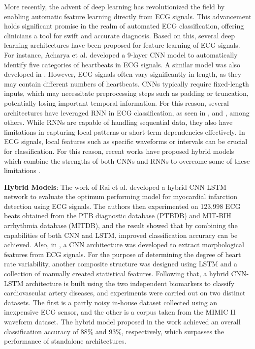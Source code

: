 \documentclass[preprint,12pt]{elsarticle}
\begin{document}
More recently, the advent of deep learning has revolutionized the field by enabling automatic feature learning directly from ECG signals. This advancement holds significant promise in the realm of automated ECG classification, offering clinicians a tool for swift and accurate diagnosis. Based on this, several deep learning architectures have been proposed for feature learning of ECG signals. For instance, Acharya et al. \citep{acharya2017deep} developed a 9-layer CNN model to automatically identify five categories of heartbeats in ECG signals. A similar model was also developed in \citep{baloglu2019classification}. However, ECG signals often vary significantly in length, as they may contain different numbers of heartbeats. CNNs typically require fixed-length inputs, which may necessitate preprocessing steps such as padding or truncation, potentially losing important temporal information. For this reason, several architectures have leveraged RNN in ECG classification, as seen in \citep{singh2018classification}, \citep{prabhakararao2020attentive} and \citep{wang2023single}, among others. While RNNs are capable of handling sequential data, they also have limitations in capturing local patterns or short-term dependencies effectively. In ECG signals, local features such as specific waveforms or intervals can be crucial for classification. For this reason, recent works have proposed hybrid models which combine the strengths of both CNNs and RNNs to overcome some of these limitations \citep{sowmya2022contemplate}.

\textbf{Hybrid Models}: The work of Rai et al. \citep{rai2022hybrid} developed a hybrid CNN-LSTM network to evaluate the optimum performing model for myocardial infarction detection using ECG signals. The authors then experimented on 123,998 ECG beats obtained from the PTB diagnostic database (PTBDB) and MIT-BIH arrhythmia database (MITDB), and the result showed that by combining the capabilities of both CNN and LSTM, improved classification accuracy can be achieved. Also, in \citep{Banerjee2020}, a CNN architecture was developed to extract morphological features from ECG signals. For the purpose of determining the degree of heart rate variability, another composite structure was designed using LSTM and a collection of manually created statistical features. Following that, a hybrid CNN-LSTM architecture is built using the two independent biomarkers to classify cardiovascular artery diseases, and experiments were carried out on two distinct datasets. The first is a partly noisy in-house dataset collected using an inexpensive ECG sensor, and the other is a corpus taken from the MIMIC II waveform dataset. The hybrid model proposed in the work achieved an overall classification accuracy of 88\% and 93\%, respectively, which surpasses the performance of standalone architectures. 
\end{document}
